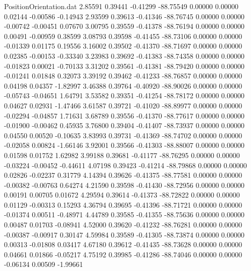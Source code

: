 \begin{filecontents}{PositionOrientation.dat}
   2.85591    0.39441   -0.41299   -88.75549    0.00000    0.00000    0.02144   -0.00586   -0.14943
   2.93599    0.39613   -0.41346   -88.76745    0.00000    0.00000   -0.00742   -0.00451    0.07670
   3.00795    0.39559   -0.41378   -88.76194    0.00000    0.00000    0.00491   -0.00959    0.38599
   3.08793    0.39598   -0.41455   -88.73106    0.00000    0.00000   -0.01339    0.01175    0.19556
   3.16002    0.39502   -0.41370   -88.71697    0.00000    0.00000    0.02385   -0.00153   -0.33340
   3.23983    0.39692   -0.41383   -88.74358    0.00000    0.00000   -0.01823    0.00021   -0.70133
   3.31202    0.39561   -0.41381   -88.79420    0.00000    0.00000   -0.01241    0.01848    0.32073
   3.39192    0.39462   -0.41233   -88.76857    0.00000    0.00000    0.04198    0.04357   -1.82997
   3.46388    0.39764   -0.40920   -88.90026    0.00000    0.00000   -0.05743   -0.04651    1.64791
   3.53582    0.39351   -0.41254   -88.78172    0.00000    0.00000    0.04627    0.02931   -1.47466
   3.61587    0.39721   -0.41020   -88.89977    0.00000    0.00000   -0.02294   -0.04857    1.71631
   3.68789    0.39556   -0.41370   -88.77617    0.00000    0.00000   -0.01900   -0.00462    0.45935
   3.76800    0.39404   -0.41407   -88.73937    0.00000    0.00000    0.04550    0.00520   -0.10635
   3.83993    0.39731   -0.41369   -88.74702    0.00000    0.00000   -0.02058    0.00824   -1.66146
   3.92001    0.39566   -0.41303   -88.88007    0.00000    0.00000    0.01598    0.01752    1.62982
   3.99188    0.39681   -0.41177   -88.76295    0.00000    0.00000   -0.03224   -0.00452   -0.44611
   4.07198    0.39423   -0.41214   -88.79868    0.00000    0.00000    0.02826   -0.02237    0.31779
   4.14394    0.39626   -0.41375   -88.77581    0.00000    0.00000   -0.00382   -0.00763    0.64274
   4.21590    0.39598   -0.41430   -88.72956    0.00000    0.00000    0.00191    0.00705    0.01672
   4.29594    0.39614   -0.41373   -88.72822    0.00000    0.00000    0.01129   -0.00313    0.15293
   4.36794    0.39695   -0.41396   -88.71721    0.00000    0.00000   -0.01374    0.00511   -0.48971
   4.44789    0.39585   -0.41355   -88.75636    0.00000    0.00000    0.00487    0.01703   -0.08941
   4.52000    0.39620   -0.41232   -88.76281    0.00000    0.00000   -0.00387   -0.00917    0.30147
   4.59984    0.39589   -0.41305   -88.73874    0.00000    0.00000    0.00313   -0.01808    0.03417
   4.67180    0.39612   -0.41435   -88.73628    0.00000    0.00000    0.04661    0.01866   -0.05217
   4.75192    0.39985   -0.41286   -88.74046    0.00000    0.00000   -0.06134    0.00509   -1.99661

\end{filecontents}
